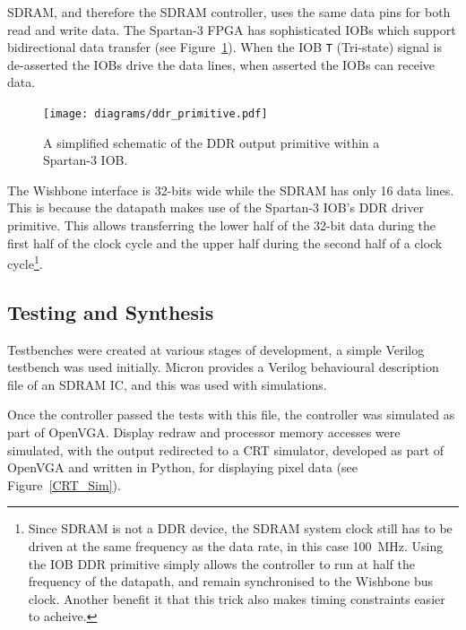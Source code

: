 SDRAM, and therefore the SDRAM controller, uses the same data pins for both read
and write data. The Spartan-3 FPGA has sophisticated IOBs which support
bidirectional data transfer (see Figure~\ref{MEM_DDR_IOB}). When the IOB
\texttt{T} (Tri-state) signal is de-asserted the IOBs drive the data lines, when
asserted the IOBs can receive data.

\begin{figure}[h!]
\begin{center}
\texttt{[image: diagrams/ddr\_primitive.pdf]}
\caption[Spartan-3 DDR IOB Primitive]{A simplified schematic of the DDR output
primitive within a Spartan-3 IOB\cite{Xilinx_SP3_DS}.}
\label{MEM_DDR_IOB}
\end{center}
\end{figure}

The Wishbone interface is 32-bits wide while the SDRAM has only 16 data lines.
This is because the datapath makes use of the Spartan-3 IOB's DDR driver
primitive. This allows transferring the lower half of the 32-bit data during the
first half of the clock cycle and the upper half during the second half of a
clock cycle\footnote{Since SDRAM is not a DDR device, the SDRAM system clock
still has to be driven at the same frequency as the data rate, in this case
100~MHz. Using the IOB DDR primitive simply allows the controller to run at half
the frequency of the datapath, and remain synchronised to the Wishbone bus clock.
Another benefit it that this trick also makes timing constraints easier to
acheive.}.


\subsection{Testing and Synthesis}
Testbenches were created at various stages of development, a simple Verilog
testbench was used initially. Micron provides a Verilog behavioural description
file of an SDRAM IC, and this was used with simulations.

Once the controller passed the tests with this file, the controller was simulated
as part of OpenVGA. Display redraw and processor memory accesses were simulated,
with the output redirected to a CRT simulator, developed as part of OpenVGA and
written in Python, for displaying pixel data (see Figure~\ref{CRT_Sim}).

